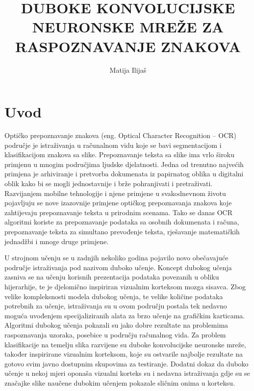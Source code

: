 \documentclass[lmodern, utf8, diplomski, numeric]{fer}
\begin{document}

\title{DUBOKE KONVOLUCIJSKE NEURONSKE MREŽE ZA RASPOZNAVANJE ZNAKOVA}

\author{Matija Ilijaš}

\maketitle

\izvornik

\zahvala{}

\tableofcontents

\chapter{Uvod}

Optičko prepoznavanje znakova  (eng. Optical Character Recognition – OCR) područje je istraživanja u računalnom vidu koje se bavi segmentacijom i klasifikacijom znakova sa slike. Prepoznavanje teksta sa slike ima vrlo široku primjenu u mnogim područjima ljudske djelatnosti. Jedna od trenutno najvećih primjena je arhiviranje i pretvorba dokumenata iz papirnatog oblika u digitalni oblik kako bi se mogli jednostavnije i brže pohranjivati i pretraživati. Razvijanjem mobilne tehnologije i njene primjene u svakodnevnom životu pojavljuju se nove izazovnije primjene optičkog prepoznavanja znakova koje zahtijevaju prepoznavanje teksta u prirodnim scenama. Tako se danas OCR algoritmi koriste za prepoznavanje podataka sa osobnih dokumenata i računa, prepoznavanje teksta za simultano prevođenje teksta, rješavanje matematičkih jednadžbi i mnoge druge primjene.

U strojnom učenju se u zadnjih nekoliko godina pojavilo novo obečavajuće područje istraživanja pod nazivom duboko učenje. Koncept dubokog učenja zasniva se na učenju korisnih prezentacija podataka povezanih u obliku hijerarhije, te je djelomično inspiriran vizualnim korteksom mozga sisavca. Zbog velike kompleksnosti modela dubokog učenja, te velike količine podataka potrebnih za učenje, istraživanja su u ovom području postala tek nedavno moguća uvođenjem specijaliziranih alata za brzo učenje na grafičkim karticama. Algoritmi dubokog učenja pokazali su jako dobre rezultate na problemima raspoznavanja uzoraka, posebice u području računalnog vida. Za problem klasifikacije na temelju slika razvijene su duboke konvolucijske neuronske mreže, također inspirirane vizualnim korteksom, koje su ostvarile najbolje rezultate na gotovo svim javno dostupnim skupovima za testiranje. Dodatni dokaz da duboko učenje u nekoj mjeri oponaša vizualni korteks su i nedavna istraživanja gdje su se značajke slike naučene dubokim učenjem pokazale sličnim onima u korteksu.
\end{document}
